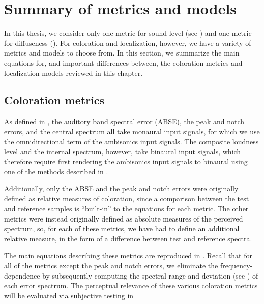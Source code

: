 \section{Summary of metrics and models}
In this thesis, we consider only one metric for sound level (see ) and one metric for diffuseness ().
For coloration and localization, however, we have a variety of metrics and models to choose from.
In this section, we summarize the main equations for, and important differences between, the coloration metrics and localization models reviewed in this chapter.

\subsection{Coloration metrics}
As defined in , the auditory band spectral error (ABSE), the peak and notch errors, and the central spectrum all take monaural input signals, for which we use the omnidirectional term of the ambisonics input signals.
The composite loudness level and the internal spectrum, however, take binaural input signals, which therefore require first rendering the ambisonics input signals to binaural using one of the methods described in .



Additionally, only the ABSE and the peak and notch errors were originally defined as relative measures of coloration, since a comparison between the test and reference samples is ``built-in'' to the equations for each metric.
The other metrics were instead originally defined as absolute measures of the perceived spectrum, so, for each of these metrics, we have had to define an additional relative measure, in the form of a difference between test and reference spectra.

The main equations describing these metrics are reproduced in .
Recall that for all of the metrics except the peak and notch errors, we eliminate the frequency-dependence by subsequently computing the spectral range and deviation (see ) of each error spectrum.
The perceptual relevance of these various coloration metrics will be evaluated via subjective testing in 

